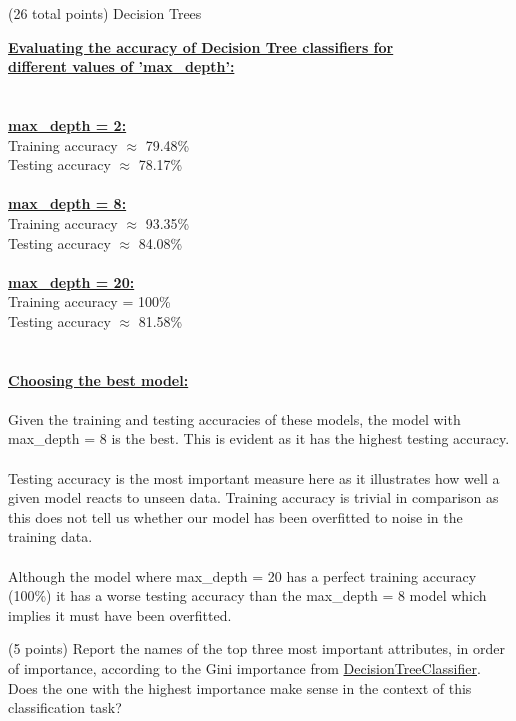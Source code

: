 \documentclass[12pt]{article}
\begin{document}
\begin{question}{(26 total points) Decision Trees}
\begin{subquestion}
\begin{answerbox}{39em}
\large{\textbf{\underline{Evaluating the accuracy of Decision Tree classifiers for}}}\\
\large{\textbf{\underline{different values of 'max\_depth':}}}\\
\\
\\
\normalsize{\textbf{\underline{max\_depth = 2:}}}\\
\footnotesize{
Training accuracy $\approx$ 79.48\%\\
Testing accuracy $\approx$ 78.17\%\\
}
\\
\normalsize{\textbf{\underline{max\_depth = 8:}}}\\
\footnotesize{
Training accuracy $\approx$ 93.35\%\\
Testing accuracy $\approx$ 84.08\%\\
}
\\
\normalsize{\textbf{\underline{max\_depth = 20:}}}\\
\footnotesize{
Training accuracy = 100\%\\
Testing accuracy $\approx$ 81.58\%
}
\\
\\
\\
\normalsize{\textbf{\underline{Choosing the best model:}}\\
\\
Given the training and testing accuracies of these models, the model with max\_depth = 8 is the best. This is evident as it has the highest testing accuracy.\\
\\
Testing accuracy is the most important measure here as it illustrates how well a given model reacts to unseen data. Training accuracy is trivial in comparison as this does not tell us whether our model has been overfitted to noise in the training data.\\
\\
Although the model where max\_depth = 20 has a perfect training accuracy (100\%) it has a worse testing accuracy than the max\_depth = 8 model which implies it must have been overfitted.
}
\end{answerbox}



\end{subquestion}


%
%
\begin{subquestion}{(5 points) 
Report the names of the top three most important attributes, in order of importance, according to the Gini importance from \href{https://scikit-learn.org/0.19/modules/generated/sklearn.tree.DecisionTreeClassifier.html}{DecisionTreeClassifier}. 
Does the one with the highest importance make sense in the context of this classification task? \\
}



\end{subquestion}
\end{question}
\end{document}
